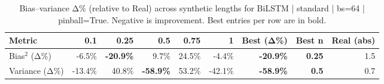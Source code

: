 \renewcommand{\arraystretch}{1.2}
\begin{table}[!t]
\centering
\footnotesize
\caption{Bias–variance Δ\% (relative to Real) across synthetic lengths for BiLSTM | standard | bs=64 | pinball=True. Negative is improvement. Best entries per row are in bold.}
\label{tab:bvdelta_BiLSTM_standard_bs64_pinballTrue}
\setlength{\tabcolsep}{5pt}
\begin{tabular}{lrrrrrrrr}
\toprule
Metric & 0.1 & 0.25 & 0.5 & 0.75 & 1 & Best (Δ\%) & Best n & Real (abs) \\
\midrule
Bias$^2$ (Δ\%) & -6.5\% & \textbf{-20.9\%} & 9.7\% & 24.5\% & -4.4\% & \textbf{-20.9\%} & \textbf{0.25} & 1.5 \\
Variance (Δ\%) & -13.4\% & 40.8\% & \textbf{-58.9\%} & 53.2\% & -42.1\% & \textbf{-58.9\%} & \textbf{0.5} & 0.7 \\
\bottomrule
\end{tabular}

\end{table}

